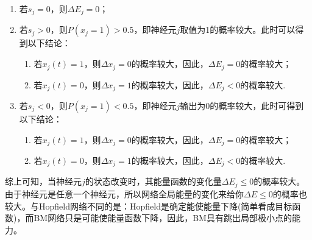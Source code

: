             \begin{enumerate}
                \item 若$s_j = 0$，则$\Delta E_j = 0$；
                \item 若$s_j >0$，则$P(x_j=1) > 0.5$，即神经元$j$取值为1的概率较大。此时可以得到以下结论：
                    \begin{enumerate}
                    \item 若$x_j(t)=1$，则$\Delta x_j =0$的概率较大，因此，$\Delta E_j = 0$的概率较大；
                    \item 若$x_j(t)=0$，则$\Delta x_j =1$的概率较大，因此，$\Delta E_j < 0$的概率较大.
                    \end{enumerate}
                \item 若$s_j <0$，则$P(x_j=1)<0.5$，即神经元$j$输出为0的概率较大，此时可得到以下结论：
                    \begin{enumerate}
                    \item 若$x_j(t)=1$，则$\Delta x_j =0$的概率较大，因此，$\Delta E_j = 0$的概率较大；
                    \item 若$x_j(t)=0$，则$\Delta x_j =1$的概率较大，因此，$\Delta E_j < 0$的概率较大.
                    \end{enumerate}
            \end{enumerate}
            \par
            综上可知，当神经元$j$的状态改变时，其能量函数的变化量$\Delta E_j \leqslant 0$的概率较大。由于神经元是任意一个神经元，所以网络全局能量的变化来给你$\Delta E \leqslant 0$的概率也较大。与Hopfield网络不同的是：Hopfield是确定能使能量下降(简单看成目标函数)，而BM网络只是可能使能量函数下降，因此，BM具有跳出局部极小点的能力。
